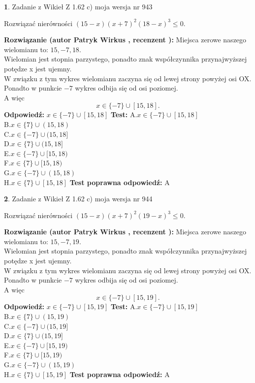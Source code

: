 \documentclass[12pt, a4paper]{article}
\theoremstyle{definition} %
\newtheorem{zad}{}
\newcommand{\zadStart}[1]{\begin{zad}#1\newline}
\newcommand{\zadStop}{\end{zad}}
\newcommand{\rozwStart}[2]{\noindent \textbf{Rozwiązanie (autor #1 , recenzent #2): }\newline}
\newcommand{\rozwStop}{\newline}
\newcommand{\odpStart}{\noindent \textbf{Odpowiedź:}\newline}
\newcommand{\odpStop}{\newline}
\newcommand{\testStart}{\noindent \textbf{Test:}\newline}
\newcommand{\testStop}{\newline}
\newcommand{\kluczStart}{\noindent \textbf{Test poprawna odpowiedź:}\newline}
\newcommand{\kluczStop}{\newline}
\begin{document}
\zadStart{Zadanie z Wikieł Z 1.62 c) moja wersja nr 943}

Rozwiązać nierówności $(15-x)(x+7)^{2}(18-x)^{3}\le0$.
\zadStop
\rozwStart{Patryk Wirkus}{}
Miejsca zerowe naszego wielomianu to: $15, -7, 18$.\\
Wielomian jest stopnia parzystego, ponadto znak współczynnika przy\linebreak najwyższej potędze x jest ujemny.\\ W związku z tym wykres wielomianu zaczyna się od lewej strony powyżej osi OX.\\
Ponadto w punkcie $-7$ wykres odbija się od osi poziomej.\\
A więc $$x \in \{-7\} \cup [15,18].$$
\rozwStop
\odpStart
$x \in \{-7\} \cup [15,18]$
\odpStop
\testStart
A.$x \in \{-7\} \cup [15,18]$\\
B.$x \in \{7\} \cup (15,18)$\\
C.$x \in \{-7\} \cup (15,18]$\\
D.$x \in \{7\} \cup (15,18]$\\
E.$x \in \{-7\} \cup [15,18)$\\
F.$x \in \{7\} \cup [15,18)$\\
G.$x \in \{-7\} \cup (15,18)$\\
H.$x \in \{7\} \cup [15,18]$
\testStop
\kluczStart
A
\kluczStop



\zadStart{Zadanie z Wikieł Z 1.62 c) moja wersja nr 944}

Rozwiązać nierówności $(15-x)(x+7)^{2}(19-x)^{3}\le0$.
\zadStop
\rozwStart{Patryk Wirkus}{}
Miejsca zerowe naszego wielomianu to: $15, -7, 19$.\\
Wielomian jest stopnia parzystego, ponadto znak współczynnika przy\linebreak najwyższej potędze x jest ujemny.\\ W związku z tym wykres wielomianu zaczyna się od lewej strony powyżej osi OX.\\
Ponadto w punkcie $-7$ wykres odbija się od osi poziomej.\\
A więc $$x \in \{-7\} \cup [15,19].$$
\rozwStop
\odpStart
$x \in \{-7\} \cup [15,19]$
\odpStop
\testStart
A.$x \in \{-7\} \cup [15,19]$\\
B.$x \in \{7\} \cup (15,19)$\\
C.$x \in \{-7\} \cup (15,19]$\\
D.$x \in \{7\} \cup (15,19]$\\
E.$x \in \{-7\} \cup [15,19)$\\
F.$x \in \{7\} \cup [15,19)$\\
G.$x \in \{-7\} \cup (15,19)$\\
H.$x \in \{7\} \cup [15,19]$
\testStop
\kluczStart
A
\kluczStop
\end{document}
